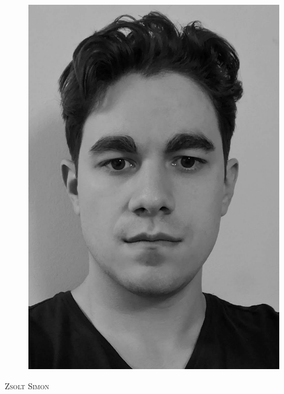 

\setlength{\parindent}{0em}

\def \leftHeader{CV}
\def \rightHeader{Zsolt Simon}
\def \position{JavaScript Engineer}

\setmainfont[Mapping=tex-text,Numbers=OldStyle,Ligatures=TeX]{Linux Biolinum O}



\begin{figure}
  \flushright
  \includegraphics[scale=0.4]{portrait_mono} 
\end{figure}

\begin{Large}
  \textsc{Zsolt Simon}
  \vspace{1em}
\end{Large}

